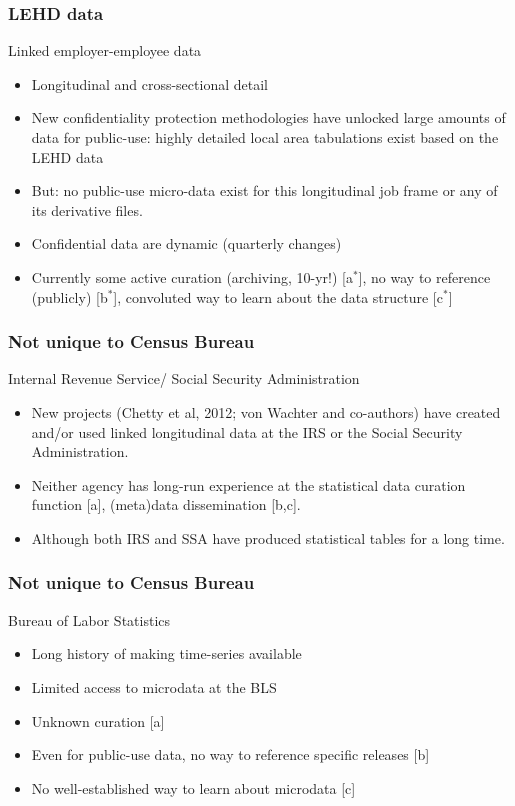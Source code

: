 \begin{frame}
\frametitle{LEHD data}
\begin{block}{Linked employer-employee data}
\begin{itemize}
\item Longitudinal and cross-sectional detail
\item New confidentiality protection methodologies \cite{AbowdEtAl2012,Ashwin2008}
have unlocked large amounts of data for public-use: highly detailed local area tabulations
exist based on the {LEHD} data
\item But: no public-use micro-data exist for this
longitudinal job frame or any of its derivative files.
\item Confidential data are dynamic (quarterly changes)
\item Currently some active curation (archiving, 10-yr!) [a$^*$], no way to reference (publicly) [b$^*$], convoluted way to learn about the data structure [c$^*$]
\end{itemize}
\end{block}
\end{frame}

\begin{frame}
\frametitle{Not unique to Census Bureau}
\begin{block}{Internal Revenue Service/ Social Security Administration}
\begin{itemize}
\item
New projects (Chetty et al, 2012; von Wachter and co-authors) have created and/or used linked longitudinal data at the IRS or the Social Security Administration.
\item Neither agency has long-run experience at the statistical data curation function [a], (meta)data dissemination [b,c].
\item Although both IRS and SSA have produced statistical tables for a long time.
\end{itemize}
\end{block}
\end{frame}

\begin{frame}
\frametitle{Not unique to Census Bureau}
\begin{block}{Bureau of Labor Statistics}
\begin{itemize}
\item Long history of making time-series available
\item Limited access to microdata at the BLS 
\item Unknown curation [a]
\item Even for public-use data, no way to reference specific releases [b]
\item No well-established way to learn about microdata [c]
\end{itemize}
\end{block}
\end{frame}

